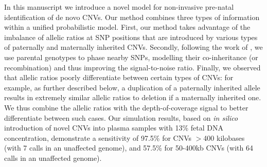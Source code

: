 In this manuscript we introduce a novel model for non-invasive pre-natal identification of de novo CNVs. Our method combines three types of information within a unified probabilistic model. First, our method takes advantage of the imbalance of allelic ratios at SNP positions that are introduced by various types of paternally and maternally inherited CNVs. Secondly, following the work of \cite{kitzman2012}, we use parental genotypes to phase nearby SNPs, modelling their co-inheritance (or recombination) and thus improving the signal-to-noise ratio. Finally, we observed that allelic ratios poorly differentiate between certain types of CNVs: for example, as further described below,  a duplication of a paternally inherited allele results in extremely similar allelic ratios to deletion if a maternally inherited one. We thus combine the allelic ratios with the depth-of-coverage signal to better differentiate between such cases. Our simulation results, based on \emph{in silico} introduction of novel CNVs into plasma samples with 13\% fetal DNA concentration, demonstrate a sensitivity of 97.5\% for CNVs $>$400 kilobases (with 7 calls in an unaffected genome),  and 57.5\% for 50-400kb CNVs (with 64 calls in an unaffected genome).


